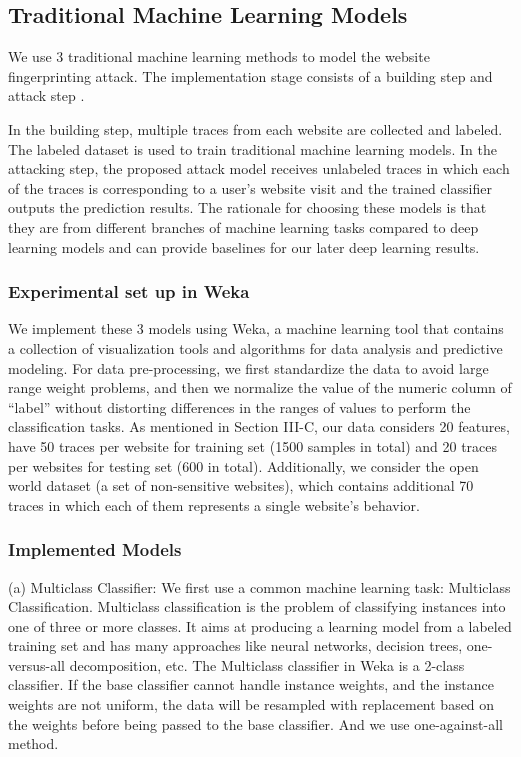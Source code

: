 \documentclass[conference]{IEEEtran}
\begin{document}
\subsection{Traditional Machine Learning Models}
We use 3 traditional machine learning methods to model the website fingerprinting attack. The implementation stage consists of a building step and attack step \cite{b1}. 
\par In the building step, multiple traces from each website are collected and labeled. The labeled dataset is used to train traditional machine learning models. In the attacking step, the proposed attack model receives unlabeled traces in which each of the traces is corresponding to a user’s website visit and the trained classifier outputs the prediction results. The rationale for choosing these models is that they are from different branches of machine learning tasks compared to deep learning models and can provide baselines for our later deep learning results. 
\subsubsection{Experimental set up in Weka}
We implement these 3 models using Weka, a machine learning tool that contains a collection of visualization tools and algorithms for data analysis and predictive modeling. For data pre-processing, we first standardize the data to avoid large range weight problems, and then we normalize the value of the numeric column of “label” without distorting differences in the ranges of values to perform the classification tasks. As mentioned in Section III-C, our data considers 20 features, have 50 traces per website for training set (1500 samples in total) and 20 traces per websites for testing set (600 in total). Additionally, we consider the open world dataset (a set of non-sensitive websites), which contains additional 70 traces in which each of them represents a single website’s behavior.
\subsubsection{Implemented Models}
(a) Multiclass Classifier: We first use a common machine learning task: Multiclass Classification. Multiclass classification is the problem of classifying instances into one of three or more classes. It aims at producing a learning model from a labeled training set and has many approaches like neural networks, decision trees, one-versus-all decomposition, etc. \cite{b4} The Multiclass classifier in Weka is a 2-class classifier. If the base classifier cannot handle instance weights, and the instance weights are not uniform, the data will be resampled with replacement based on the weights before being passed to the base classifier. And we use one-against-all method. 
\end{document}
